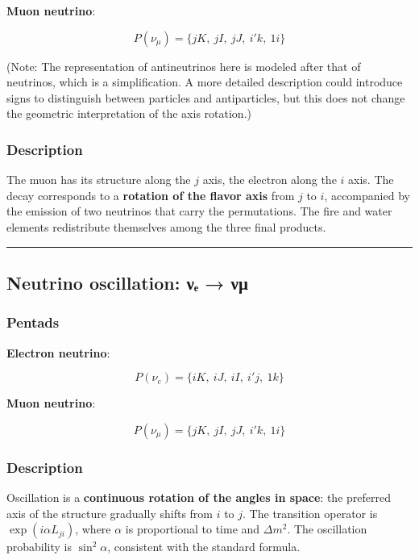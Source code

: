 \documentclass[11pt]{article}
\begin{document}
\textbf{Muon neutrino}:

\[
P(\nu_\mu) = \{ jK,\ jI,\ jJ,\ i'k,\ 1i \}
\]

(Note: The representation of antineutrinos here is modeled after that of
neutrinos, which is a simplification. A more detailed description could
introduce signs to distinguish between particles and antiparticles, but
this does not change the geometric interpretation of the axis rotation.)

\hypertarget{description-1}{%
\subsubsection{Description}\label{description-1}}

The muon has its structure along the \(j\) axis, the electron along the
\(i\) axis. The decay corresponds to a \textbf{rotation of the flavor
axis} from \(j\) to \(i\), accompanied by the emission of two neutrinos
that carry the permutations. The fire and water elements redistribute
themselves among the three final products.

\begin{center}\rule{0.5\linewidth}{0.5pt}\end{center}

\hypertarget{neutrino-oscillation-ux3bdux2091-ux3bdux3bc}{%
\subsection{Neutrino oscillation: νₑ →
νμ}\label{neutrino-oscillation-ux3bdux2091-ux3bdux3bc}}

\hypertarget{pentads-2}{%
\subsubsection{Pentads}\label{pentads-2}}

\textbf{Electron neutrino}:

\[
P(\nu_e) = \{ iK,\ iJ,\ iI,\ i'j,\ 1k \}
\]

\textbf{Muon neutrino}:

\[
P(\nu_\mu) = \{ jK,\ jI,\ jJ,\ i'k,\ 1i \}
\]

\hypertarget{description-2}{%
\subsubsection{Description}\label{description-2}}

Oscillation is a \textbf{continuous rotation of the angles in space}:
the preferred axis of the structure gradually shifts from \(i\) to
\(j\). The transition operator is \(\exp(i\alpha L_{ji})\), where
\(\alpha\) is proportional to time and \(\Delta m^2\). The oscillation
probability is \(\sin^2\alpha\), consistent with the standard formula.
\end{document}
